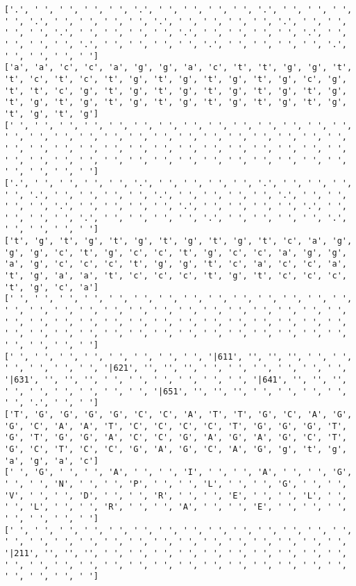 \documentclass{article}
\begin{document}
\begin{Verbatim}
['.', ' ', ' ', ' ', ' ', '.', ' ', ' ', ' ', ' ', '.', ' ', ' ', ' ', ' ', '.', ' ', ' ', ' ', ' ', '.', ' ', ' ', ' ', ' ', '.', ' ', ' ', ' ', ' ', '.', ' ', ' ', ' ', ' ', '.', ' ', ' ', ' ', ' ', '.', ' ', ' ', ' ', ' ', '.', ' ', ' ', ' ', ' ', '.', ' ', ' ', ' ', ' ', '.', ' ', ' ', ' ', ' ']
['a', 'a', 'c', 'c', 'a', 'g', 'g', 'a', 'c', 't', 't', 'g', 'g', 't', 't', 'c', 't', 'c', 't', 'g', 't', 'g', 't', 'g', 't', 'g', 'c', 'g', 't', 't', 'c', 'g', 't', 'g', 't', 'g', 't', 'g', 't', 'g', 't', 'g', 't', 'g', 't', 'g', 't', 'g', 't', 'g', 't', 'g', 't', 'g', 't', 'g', 't', 'g', 't', 'g']
[' ', ' ', ' ', ' ', ' ', ' ', ' ', ' ', ' ', ' ', ' ', ' ', ' ', ' ', ' ', ' ', ' ', ' ', ' ', ' ', ' ', ' ', ' ', ' ', ' ', ' ', ' ', ' ', ' ', ' ', ' ', ' ', ' ', ' ', ' ', ' ', ' ', ' ', ' ', ' ', ' ', ' ', ' ', ' ', ' ', ' ', ' ', ' ', ' ', ' ', ' ', ' ', ' ', ' ', ' ', ' ', ' ', ' ', ' ', ' ']
['.', ' ', ' ', ' ', ' ', '.', ' ', ' ', ' ', ' ', '.', ' ', ' ', ' ', ' ', '.', ' ', ' ', ' ', ' ', '.', ' ', ' ', ' ', ' ', '.', ' ', ' ', ' ', ' ', '.', ' ', ' ', ' ', ' ', '.', ' ', ' ', ' ', ' ', '.', ' ', ' ', ' ', ' ', '.', ' ', ' ', ' ', ' ', '.', ' ', ' ', ' ', ' ', '.', ' ', ' ', ' ', ' ']
['t', 'g', 't', 'g', 't', 'g', 't', 'g', 't', 'g', 't', 'c', 'a', 'g', 'g', 'g', 'c', 't', 'g', 'c', 'c', 't', 'g', 'c', 'c', 'a', 'g', 'g', 'a', 'g', 'c', 'c', 'c', 't', 'g', 'g', 't', 'c', 'a', 'c', 'c', 'a', 't', 'g', 'a', 'a', 't', 'c', 'c', 'c', 't', 'g', 't', 'c', 'c', 'c', 't', 'g', 'c', 'a']
[' ', ' ', ' ', ' ', ' ', ' ', ' ', ' ', ' ', ' ', ' ', ' ', ' ', ' ', ' ', ' ', ' ', ' ', ' ', ' ', ' ', ' ', ' ', ' ', ' ', ' ', ' ', ' ', ' ', ' ', ' ', ' ', ' ', ' ', ' ', ' ', ' ', ' ', ' ', ' ', ' ', ' ', ' ', ' ', ' ', ' ', ' ', ' ', ' ', ' ', ' ', ' ', ' ', ' ', ' ', ' ', ' ', ' ', ' ', ' ']
[' ', ' ', ' ', ' ', ' ', ' ', ' ', ' ', '|611', '', '', '', ' ', ' ', ' ', ' ', ' ', ' ', '|621', '', '', '', ' ', ' ', ' ', ' ', ' ', ' ', '|631', '', '', '', ' ', ' ', ' ', ' ', ' ', ' ', '|641', '', '', '', ' ', ' ', ' ', ' ', ' ', ' ', '|651', '', '', '', ' ', ' ', ' ', ' ', ' ', '.', ' ', ' ']
['T', 'G', 'G', 'G', 'G', 'C', 'C', 'A', 'T', 'T', 'G', 'C', 'A', 'G', 'G', 'C', 'A', 'A', 'T', 'C', 'C', 'C', 'C', 'T', 'G', 'G', 'G', 'T', 'G', 'T', 'G', 'G', 'A', 'C', 'C', 'G', 'A', 'G', 'A', 'G', 'C', 'T', 'G', 'C', 'T', 'C', 'C', 'G', 'A', 'G', 'C', 'A', 'G', 'g', 't', 'g', 'a', 'g', 'a', 'c']
[' ', 'G', ' ', ' ', 'A', ' ', ' ', 'I', ' ', ' ', 'A', ' ', ' ', 'G', ' ', ' ', 'N', ' ', ' ', 'P', ' ', ' ', 'L', ' ', ' ', 'G', ' ', ' ', 'V', ' ', ' ', 'D', ' ', ' ', 'R', ' ', ' ', 'E', ' ', ' ', 'L', ' ', ' ', 'L', ' ', ' ', 'R', ' ', ' ', 'A', ' ', ' ', 'E', ' ', ' ', ' ', ' ', ' ', ' ', ' ']
[' ', ' ', ' ', ' ', ' ', ' ', ' ', ' ', ' ', ' ', ' ', ' ', ' ', ' ', ' ', ' ', ' ', ' ', ' ', ' ', ' ', ' ', ' ', ' ', ' ', ' ', ' ', ' ', '|211', '', '', '', ' ', ' ', ' ', ' ', ' ', ' ', ' ', ' ', ' ', ' ', ' ', ' ', ' ', ' ', ' ', ' ', ' ', ' ', ' ', ' ', ' ', ' ', ' ', ' ', ' ', ' ', ' ', ' ']
  

\end{Verbatim}
\end{document}
